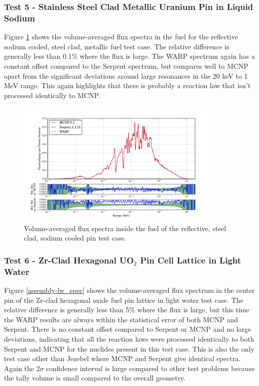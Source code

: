 \documentclass[preprint,12pt]{elsarticle}
\begin{document}
\newpage
\subsubsection{Test 5 - Stainless Steel Clad Metallic Uranium Pin in Liquid Sodium}

Figure \ref{sodiumpin_spec} shows the volume-averaged flux spectra in the fuel for the reflective sodium cooled, steel clad, metallic fuel test case.  The relative difference is generally less than 0.1\% where the flux is large.  The WARP spectrum again has a constant offset compared to the Serpent spectrum, but compares well to MCNP apart from the significant deviations around large resonances in the 20 keV to 1 MeV range.  This again highlights that there is probably a reaction law that isn't processed identically to MCNP.

\begin{figure}[h!]
\centering
\includegraphics[width=0.9\textwidth,trim= 1cm 0cm 1cm 0cm]{graphics/sodiumpin_spec.pdf}
\caption{Volume-averaged flux spectra inside the fuel of the reflective, steel clad, sodium cooled pin test case. \label{sodiumpin_spec} }
\end{figure}


\newpage
\subsubsection{Test 6 - Zr-Clad Hexagonal UO$_2$ Pin Cell Lattice in Light Water}

Figure \ref{assembly-lw_spec} shows the volume-averaged flux spectrum in the center pin of the Zr-clad hexagonal oxide fuel pin lattice in light water test case. The relative difference is generally less than 5\% where the flux is large, but this time the WARP results are always within the statistical error of both MCNP and Serpent.  There is no constant offset compared to Serpent or MCNP and no large deviations, indicating that all the reaction laws were processed identically to both Serpent and MCNP for the nuclides present in this test case.  This is also the only test case other than Jezebel where MCNP and Serpent give identical spectra.  Again the 2$\sigma$ confidence interval is large compared to other test problems because the tally volume is small compared to the overall geometry.
\end{document}
